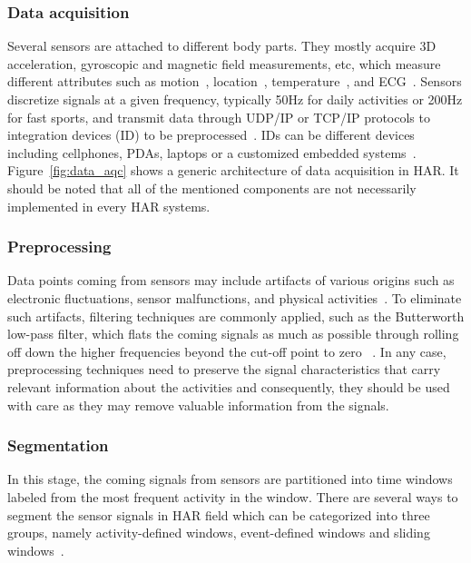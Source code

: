 \subsubsection{Data acquisition} Several sensors are attached to different body parts. They mostly acquire 3D acceleration, gyroscopic and magnetic field measurements, etc, which measure different attributes such as  motion~\citep{iglesias2011ubiquitous}, location~\citep{choujaa2008tracme}, temperature~\citep{parkka2006activity}, and ECG~\citep{jatoba2008context}. Sensors discretize signals at a given frequency, typically 50Hz for 
daily activities or 200Hz for fast sports, and transmit data through UDP/IP or TCP/IP protocols to integration devices (ID) to be preprocessed~\citep{lara2012survey}. IDs can be different devices including cellphones, PDAs, laptops or a customized embedded systems~\citep{lara2012survey}. Figure~\ref{fig:data_aqc} shows a generic architecture of data acquisition in HAR. It should be noted that all of the mentioned components are not necessarily implemented in every HAR systems.      
 

\subsubsection{Preprocessing} Data points coming from sensors may
include artifacts of various origins such as 
electronic fluctuations, sensor malfunctions, and physical activities~\cite{bulling2014tutorial}. To eliminate such artifacts, filtering techniques are commonly applied, such as the Butterworth low-pass filter, which flats the coming signals as much as possible through rolling off down the higher frequencies beyond the cut-off point to zero ~\cite{morris2014recofit,selles2005automated,najafi2003ambulatory}. In any case, preprocessing techniques need to preserve
the signal characteristics that carry relevant information about the activities and consequently, they should be used with care as they may remove valuable information from the signals.


\subsubsection{Segmentation}
In this stage, the coming signals from sensors are partitioned into time windows labeled from the most frequent activity in the window. There are several ways to segment the sensor signals in HAR field which can be categorized into three groups, namely activity-defined windows, event-defined windows and sliding windows~\cite{banos2014window}. 

